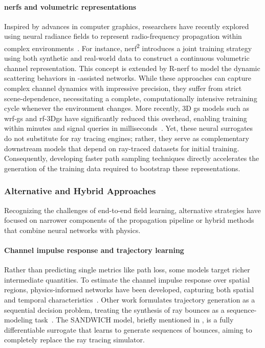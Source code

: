 \paragraph{\Glspl{nerf} and volumetric representations} Inspired by advances in computer graphics, researchers have recently explored using neural radiance fields to represent radio-frequency propagation within complex environments~. For instance, \gls{nerf}\textsuperscript{2} introduces a joint training strategy using both synthetic and real-world data to construct a continuous volumetric channel representation. This concept is extended by R-\gls{nerf} to model the dynamic scattering behaviors in -assisted networks. While these approaches can capture complex channel dynamics with impressive precision, they suffer from strict scene-dependence, necessitating a complete, computationally intensive retraining cycle whenever the environment changes. More recently, 3D \gls{gs} models such as \gls{wrf}-\gls{gs} and \gls{rf}-3D\gls{gs} have significantly reduced this overhead, enabling training within minutes and signal queries in milliseconds~. Yet, these neural surrogates do not substitute for ray tracing engines; rather, they serve as complementary downstream models that depend on ray-traced datasets for initial training. Consequently, developing faster path sampling techniques directly accelerates the generation of the training data required to bootstrap these representations.

\subsubsection{Alternative and Hybrid Approaches}

Recognizing the challenges of end-to-end field learning, alternative strategies have focused on narrower components of the propagation pipeline or hybrid methods that combine neural networks with physics.

\paragraph{Channel impulse response and trajectory learning} Rather than predicting single metrics like path loss, some models target richer intermediate quantities. To estimate the channel impulse response over spatial regions, physics-informed networks have been developed, capturing both spatial and temporal characteristics~. Other work formulates trajectory generation as a sequential decision problem, treating the synthesis of ray bounces as a sequence-modeling task~. The SANDWICH model, briefly mentioned in , is a fully differentiable surrogate that learns to generate sequences of bounces, aiming to completely replace the ray tracing simulator.

